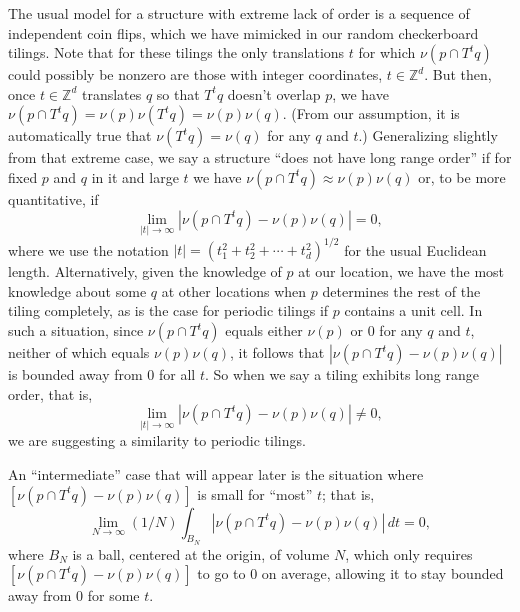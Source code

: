 \documentclass[reqno]{stml-l}
\theoremstyle{plain}
\theoremstyle{definition}
\numberwithin{equation}{chapter}
\begin{document}
The usual model for a structure with extreme lack of order
is a sequence of independent coin flips, which we have
mimicked in our random checkerboard tilings. Note that for
these tilings the only translations $t$ for which
$\nu(p\cap T^{t}q)$ could possibly be nonzero are those
with integer coordinates, $t\in \mathbb{Z}^{d}$. But then,
once $t\in \mathbb{Z}^{d}$ translates $q$ so that $T^{t}q$
doesn't overlap $p$, we have $\nu(p\cap
T^{t}q)=\nu(p)\nu(T^{t}q)=\nu(p)\nu(q)$. (From our
assumption, it is automatically true that
$\nu(T^{t}q)=\nu(q)$ for any $q$ and $t$.) Generalizing
slightly from that extreme case, we say a structure ``does
not have long range order'' if for fixed $p$ and $q$ in it
and large $t$ we have $\nu(p\cap
T^{t}q)\approx\nu(p)\nu(q)$ or, to be more quantitative, if
\begin{equation}
\lim\limits_{|t|\rightarrow\infty}|\nu(p\cap T^{t}q)-\nu(p)\nu(q)|=0,\label{ch01:eqn1.1}
\end{equation}
where we use the notation
$|t|=(t_{1}^{2}+t_{2}^{2}+\cdots+t_{d}^{2})^{1/2}$
for the usual Euclidean length. Alternatively, given the
knowledge of $p$ at our location, we have the most
knowledge about some $q$ at other locations when $p$
determines the rest of the tiling completely, as is the
case for periodic tilings if $p$ contains a unit cell. In
such a situation, since $\nu(p\cap T^{t}q)$ equals either
$\nu(p)$ or $0$ for any $q$ and $t$, neither of which
equals $\nu(p)\nu(q)$, it follows that $|\nu(p\cap
T^{t}q)-\nu(p)\nu(q)|$ is bounded away from $0$ for all
$t$. So when we say a tiling exhibits long range order,
that is,
\begin{equation}
\lim\limits_{|t|\rightarrow\infty
}|\nu(p\cap T^{t}q)-\nu(p)\nu(q)|\neq 0,\label{ch01:eqn1.2}
\end{equation}
we are suggesting a similarity to periodic tilings.

An ``intermediate'' case
that will appear later is the situation where $[\nu(p\cap
T^{t}q)-\nu(p)\nu(q)]$ is small for ``most'' $t$; that is,
\begin{equation}
\lim\limits_{N\rightarrow\infty}(1/N)\int_{B_{N}}|\nu(p\cap T^{t}q)-\nu(p)\nu(q)|\,dt=0,\label{ch01:eqn1.3}
\end{equation}
where $B_{N}$ is a ball, centered
at the origin, of volume $N$, which only requires
$[\nu(p\cap T^{t}q)-\nu(p)\nu(q)]$ to go to 0 on average,
allowing it to stay bounded away from 0 for some $t$.
\end{document}
